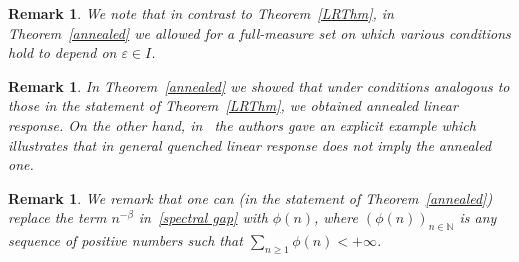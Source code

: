 \documentclass[11pt,reqno,a4paper]{article}
\theoremstyle{special}
\newtheorem{remark}[theorem]{Remark}
\renewcommand{\epsilon}{\varepsilon}
\def\N{\mathbb{N}}
\begin{document}
\begin{remark}
We note that in contrast to Theorem~\ref{LRThm}, in Theorem~\ref{annealed} we allowed for a full-measure set on which various conditions hold to depend on $\epsilon \in I$.
\end{remark}

\begin{remark}
In Theorem~\ref{annealed} we showed that under conditions analogous to those in the statement of Theorem~\ref{LRThm}, we obtained annealed linear response. On the other hand, in~\cite{DGS} the authors gave an explicit example which illustrates that in general quenched linear response does not imply the annealed one.
\end{remark}

\begin{remark}
We remark that one can (in the statement of Theorem~\ref{annealed}) replace the term $n^{-\beta}$ in~\eqref{spectral gap} with $\phi(n)$, where $(\phi(n))_{n\in \N}$ is any sequence of positive numbers such that $\sum_{n\ge 1}\phi(n)<+\infty$.
\end{remark}
\end{document}
